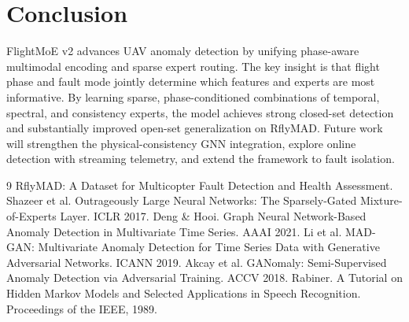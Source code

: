 \documentclass[letterpaper]{article}
\begin{document}
\section{Conclusion}
FlightMoE v2 advances UAV anomaly detection by unifying phase-aware multimodal encoding and sparse expert routing. The key insight is that flight phase and fault mode jointly determine which features and experts are most informative. By learning sparse, phase-conditioned combinations of temporal, spectral, and consistency experts, the model achieves strong closed-set detection and substantially improved open-set generalization on RflyMAD. Future work will strengthen the physical-consistency GNN integration, explore online detection with streaming telemetry, and extend the framework to fault isolation.


\begin{thebibliography}{9}
 RflyMAD: A Dataset for Multicopter Fault Detection and Health Assessment.
 Shazeer et al. Outrageously Large Neural Networks: The Sparsely-Gated Mixture-of-Experts Layer. ICLR 2017.
 Deng & Hooi. Graph Neural Network-Based Anomaly Detection in Multivariate Time Series. AAAI 2021.
 Li et al. MAD-GAN: Multivariate Anomaly Detection for Time Series Data with Generative Adversarial Networks. ICANN 2019.
 Akcay et al. GANomaly: Semi-Supervised Anomaly Detection via Adversarial Training. ACCV 2018.
 Rabiner. A Tutorial on Hidden Markov Models and Selected Applications in Speech Recognition. Proceedings of the IEEE, 1989.
\end{thebibliography}
\end{document}

